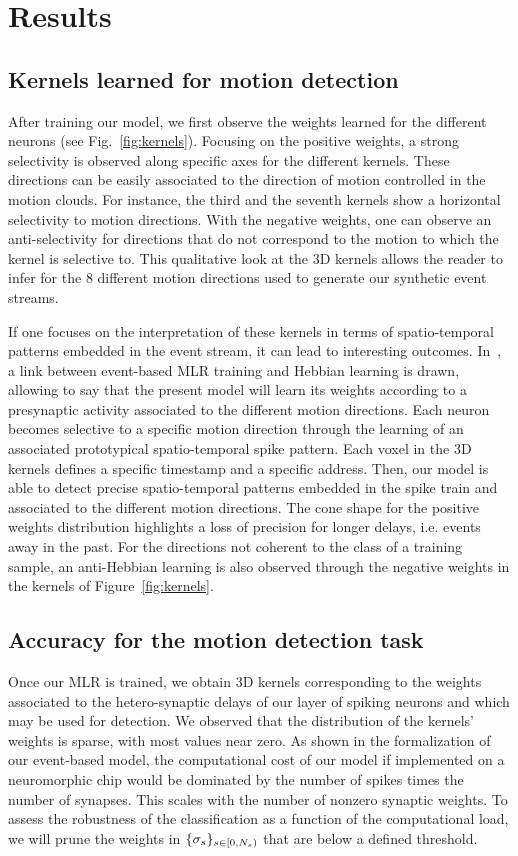 \documentclass[default]{sn-jnl}%
\theoremstyle{thmstyleone}%
\theoremstyle{thmstyletwo}%
\theoremstyle{thmstylethree}%
\newcommand{\seeFig}[1]{see Fig.~\ref{fig:#1}}%
\begin{document}
\section{Results}
\label{sec:results}
%
\subsection{Kernels learned for motion detection}
%
After training our model, we first observe the weights learned for the different neurons (\seeFig{kernels}). Focusing on the positive weights, a strong selectivity is observed along specific axes for the different kernels. These directions can be easily associated to the direction of motion controlled in the motion clouds. For instance, the third and the seventh kernels show a horizontal selectivity to motion directions.
%
With the negative weights, one can observe an anti-selectivity for directions that do not correspond to the motion to which the kernel is selective to. This qualitative look at the 3D kernels allows the reader to infer for the $8$ different motion directions used to generate our synthetic event streams.

If one focuses on the interpretation of these kernels in terms of spatio-temporal patterns embedded in the event stream, it can lead to interesting outcomes. In~\cite{Grimaldi22pami}, a link between event-based MLR training and Hebbian learning is drawn, allowing to say that the present model will learn its weights according to a presynaptic activity associated to the different motion directions. Each neuron becomes selective to a specific motion direction through the learning of an associated prototypical spatio-temporal spike pattern. Each voxel in the 3D kernels defines a specific timestamp and a specific address. Then, our model is able to detect precise spatio-temporal patterns embedded in the spike train and associated to the different motion directions. The cone shape for the positive weights distribution highlights a loss of precision for longer delays, i.e. events away in the past. For the directions not coherent to the class of a training sample, an anti-Hebbian learning is also observed through the negative weights in the kernels of Figure~\ref{fig:kernels}. 
%
\subsection{Accuracy for the motion detection task}
%
Once our MLR is trained, we obtain 3D kernels corresponding to the weights associated to the hetero-synaptic delays of our layer of spiking neurons and which may be used for detection. We observed that the distribution of the kernels' weights is sparse, with most values near zero. As shown in the formalization of our event-based model, the computational cost of our model if implemented on a neuromorphic chip would be dominated by the number of spikes times the number of synapses. This scales with the number of nonzero synaptic weights. To  assess the robustness of the classification as a function of the computational load, we will prune the weights in $\{\sigma_s\}_{s \in [0,N_{s})}$ that are below a defined threshold. 
\end{document}
